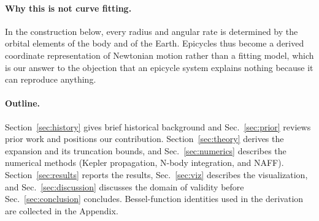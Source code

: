 \paragraph*{Why this is not curve fitting.}
In the construction below, every radius and angular rate is determined by the
orbital elements of the body and of the Earth. Epicycles thus become a
derived coordinate representation of Newtonian motion rather than a fitting
model, which is our answer to the objection that an epicycle system
explains nothing because it can reproduce anything.

\paragraph*{Outline.}
Section~\ref{sec:history} gives brief historical background and
Sec.~\ref{sec:prior} reviews prior work and positions our contribution.
Section~\ref{sec:theory} derives the expansion and its truncation bounds,
and Sec.~\ref{sec:numerics} describes the numerical methods (Kepler
propagation, N-body integration, and NAFF). Section~\ref{sec:results} reports
the results, Sec.~\ref{sec:viz} describes the visualization, and
Sec.~\ref{sec:discussion} discusses the domain of validity before
Sec.~\ref{sec:conclusion} concludes. Bessel-function identities used in the
derivation are collected in the Appendix.
